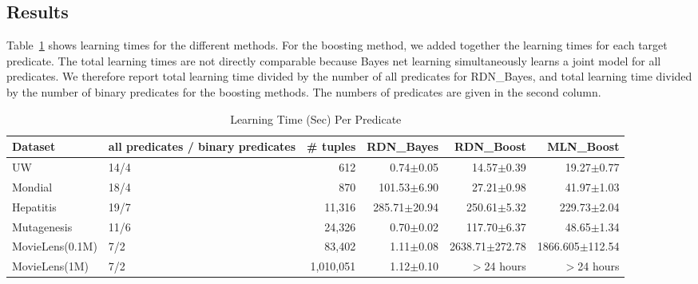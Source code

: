 \documentclass[runningheads,a4paper]{llncs}
\begin{document}
\subsection{Results} 
Table~\ref{table:learning-times} shows learning times for the different methods. For the boosting method, we added together the learning times for each target predicate. The total learning times are not directly comparable because Bayes net learning simultaneously learns a joint model for all predicates. We therefore report total learning time divided by the number of all predicates for RDN\_Bayes, and total learning time divided by the number of binary predicates for the boosting methods. The numbers of predicates are given in the second column.
\begin{table}[htbp]
  \centering
  \caption{Learning Time (Sec) Per Predicate}
    \begin{tabular}{|l|p{2cm}|r|r|r|r|}
\hline
     Dataset & all predicates / binary predicates & \# tuples & RDN\_Bayes & RDN\_Boost & MLN\_Boost \\ \hline
    UW    & 14/4  & 612   & 0.74$\pm$0.05 & 14.57$\pm$0.39 & 19.27$\pm$0.77  \\
    Mondial & 18/4  & 870   & 101.53$\pm$6.90 & 27.21$\pm$0.98 & 41.97$\pm$1.03 \\
    Hepatitis & 19/7  & 11,316 & 285.71$\pm$20.94 & 250.61$\pm$5.32 & 229.73$\pm$2.04  \\
    Mutagenesis & 11/6  & 24,326 & 0.70$\pm$0.02 & 117.70$\pm$6.37 & 48.65$\pm$1.34 \\ 
    MovieLens(0.1M) & 7/2   & 83,402 & 1.11$\pm$0.08 & 2638.71$\pm$272.78 &  1866.605$\pm$112.54\\
    MovieLens(1M) & 7/2   & 1,010,051 & 1.12$\pm$0.10 & $>$24 hours & $>$24 hours \\ \hline
  
    \end{tabular}%
  \label{table:learning-times}%
\end{table}%
%
%
\end{document}
